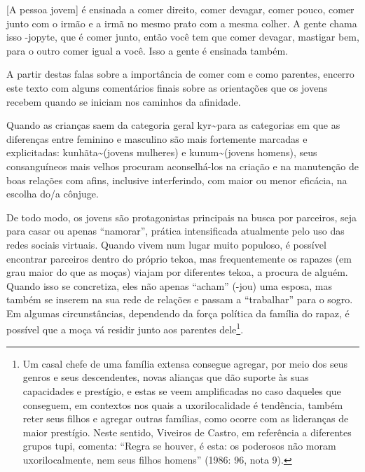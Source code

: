 \documentclass{article}
\begin{document}
[A pessoa jovem] \'e ensinada a comer direito, comer devagar, comer
pouco, comer junto com o irm\~ao e a irm\~a no mesmo prato com a mesma
colher. A gente chama isso -jopyte, que \'e comer junto, ent\~ao voc\^e
tem que comer devagar, mastigar bem, para o outro comer igual a voc\^e.
Isso a gente \'e ensinada tamb\'em.

A partir destas falas sobre a import\^ancia de comer com e como
parentes, encerro este texto com alguns coment\'arios finais sobre as
orienta\c{c}\~oes que os jovens recebem quando se iniciam nos caminhos
da afinidade.

Quando as crian\c{c}as saem da categoria geral kyr\~\igue para as
categorias em que as diferen\c{c}as entre feminino e masculino s\~ao
mais fortemente marcadas e explicitadas: kunh\~ata\~\igue (jovens
mulheres) e kunum\~\igue (jovens homens), seus consangu\'ineos mais
velhos procuram aconselh\'a-los na cria\c{c}\~ao e na manuten\c{c}\~ao
de boas rela\c{c}\~oes com afins, inclusive interferindo, com maior ou
menor efic\'acia, na escolha do/a c\^onjuge.

De todo modo, os jovens s\~ao protagonistas principais na busca por
parceiros, seja para casar ou apenas
{\textquotedblleft}namorar{\textquotedblright}, pr\'atica intensificada
atualmente pelo uso das redes sociais virtuais. Quando vivem num lugar
muito populoso, \'e poss\'ivel encontrar parceiros dentro do pr\'oprio
tekoa, mas frequentemente os rapazes (em grau maior do que as
mo\c{c}as) viajam por diferentes tekoa, a procura de algu\'em. Quando
isso se concretiza, eles n\~ao apenas
{\textquotedblleft}acham{\textquotedblright} (-jou) uma esposa, mas
tamb\'em se inserem na sua rede de rela\c{c}\~oes e passam a
{\textquotedblleft}trabalhar{\textquotedblright} para o sogro. Em
algumas circunst\^ancias, dependendo da for\c{c}a pol\'itica da
fam\'ilia do rapaz, \'e poss\'ivel que a mo\c{c}a v\'a residir junto
aos parentes dele\footnote{ Um casal chefe de uma fam\'ilia extensa
consegue agregar, por meio dos seus genros e seus descendentes, novas
alian\c{c}as que d\~ao suporte \`as suas capacidades e prest\'igio, e
estas se veem amplificadas no caso daqueles que conseguem, em contextos
nos quais a uxorilocalidade \'e tend\^encia, tamb\'em reter seus filhos
e agregar outras fam\'ilias, como ocorre com as lideran\c{c}as de maior
prest\'igio. Neste sentido, Viveiros de Castro, em refer\^encia a
diferentes grupos tupi, comenta: {\textquotedblleft}Regra se houver,
\'e esta: os poderosos n\~ao moram uxorilocalmente, nem seus filhos
homens{\textquotedblright} (1986: 96, nota 9).}. 
\end{document}
